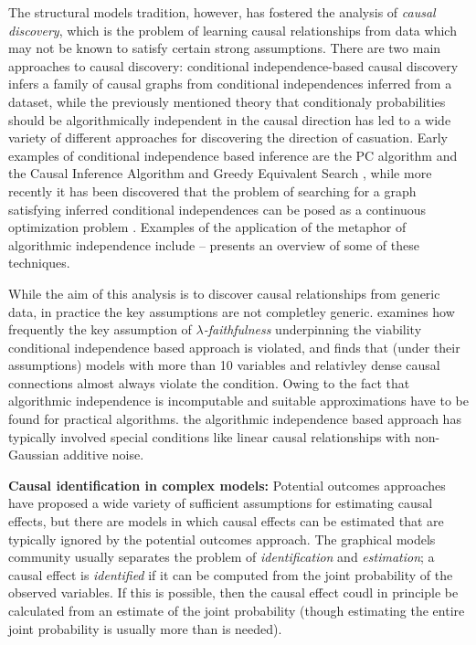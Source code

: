 The structural models tradition, however, has fostered the analysis of \emph{causal discovery}, which is the problem of learning causal relationships from data which may not be known to satisfy certain strong assumptions. There are two main approaches to causal discovery: conditional independence-based causal discovery infers a family of causal graphs from conditional independences inferred from a dataset, while the previously mentioned theory that conditionaly probabilities should be algorithmically independent in the causal direction has led to a wide variety of different approaches for discovering the direction of casuation. Early examples of conditional independence based inference are the PC algorithm and the Causal Inference Algorithm \citet[Ch. 5\& 6]{spirtes_causation_1993} and Greedy Equivalent Search \citet{chickering_optimal_2003,chickering_learning_2002}, while more recently it has been discovered that the problem of searching for a graph satisfying inferred conditional independences can be posed as a continuous optimization problem \citet{zheng_dags_2018,ng_graph_2019}. Examples of the application of the metaphor of algorithmic independence include -- \citet[ch. 4, 5, 6 \& 7]{peters_elements_2017} presents an overview of some of these techniques.

While the aim of this analysis is to discover causal relationships from generic data, in practice the key assumptions are not completley generic. \citet{uhler_geometry_2013} examines how frequently the key assumption of $\lambda$\emph{-faithfulness} underpinning the viability conditional independence based approach is violated, and finds that (under their assumptions) models with more than 10 variables and relativley dense causal connections almost always violate the condition. Owing to the fact that algorithmic independence is incomputable and suitable approximations have to be found for practical algorithms. the algorithmic independence based approach has typically involved special conditions like linear causal relationships with non-Gaussian additive noise.

\textbf{Causal identification in complex models:} Potential outcomes approaches have proposed a wide variety of sufficient assumptions for estimating causal effects, but there are models in which causal effects can be estimated that are typically ignored by the potential outcomes approach. The graphical models community usually separates the problem of \emph{identification} and \emph{estimation}; a causal effect is \emph{identified} if it can be computed from the joint probability of the observed variables. If this is possible, then the causal effect coudl in principle be calculated from an estimate of the joint probability (though estimating the entire joint probability is usually more than is needed). 

